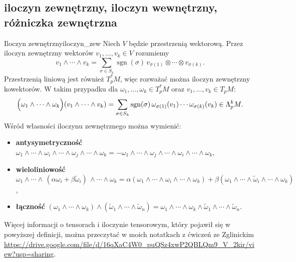 \documentclass{article}
\newcommand{\sgn}{\operatorname{sgn}}
\begin{document}
\subsection{iloczyn zewnętrzny, iloczyn wewnętrzny, różniczka zewnętrzna} \label{sec:iloczyny_różniczka}

\begin{dfn}{Iloczyn zewnętrzny}{iloczyn_zew}
  Niech $V$ będzie przestrzenią wektorową. Przez iloczyn zewnętrzny wektorów $v_1,\ldots,v_k\in V$ rozumiemy
  \[
  v_1\wedge\cdots\wedge v_k = \sum_{\sigma\in S_k} \sgn(\sigma)\, v_{\sigma(1)}\otimes\cdots\otimes v_{\sigma(k)}. 
  \]
  Przestrzenią liniową jest również $T^*_p M$, więc rozważać można iloczyn zewnętrzny kowektorów. W takim przypadku dla $\omega_1,\ldots,\omega_k\in T^*_p M$ oraz $v_1,\ldots,v_k\in T_p M$:
  \[
  \Bigl( \omega_1\wedge\cdots\wedge\omega_k \Bigr)(v_1\wedge\cdots\wedge v_k) = \sum_{\sigma\in S_k} \sgn(\sigma)\, \omega_{\sigma(1)}(v_1)\cdots \omega_{\sigma(k)}(v_k) \in \Lambda^k_p M.
  \]
  Wśród własności iloczynu zewnętrznego można wymienić:
  \begin{itemize}
    \item \textbf{antysymetryczność} $\omega_1\wedge\cdots\wedge\omega_i\wedge\cdots\wedge\omega_j\wedge\cdots\wedge\omega_k = -\omega_1\wedge\cdots\wedge\omega_j\wedge\cdots\wedge\omega_i\wedge\cdots\wedge\omega_k$,
    \item \textbf{wieloliniowość} $\omega_1\wedge\cdots\wedge\,(\alpha\omega_i+\beta\widetilde{\omega}_i)\,\wedge\cdots\wedge\omega_k = \alpha(\omega_1\wedge\cdots\wedge\omega_i\wedge\cdots\wedge\omega_k) + \beta(\omega_1\wedge\cdots\wedge\widetilde{\omega}_i\wedge\cdots\wedge\omega_k)$,
    \item \textbf{łączność} $(\omega_1\wedge\cdots\wedge\omega_k)\wedge(\widetilde{\omega}_1\wedge\cdots\wedge\widetilde{\omega}_n)=\omega_1\wedge\cdots\wedge\omega_k\wedge\widetilde{\omega}_1\wedge\cdots\wedge\widetilde{\omega}_n$.
  \end{itemize}
\end{dfn}
Więcej informacji o tensorach i iloczynie tensorowym, który pojawił się w powyższej definicji, można przeczytać w moich notatkach z ćwiczeń ze Zglinickim \url{https://drive.google.com/file/d/16qXaC4W0_puQSz4xwP2QBLQm9_V_2kir/view?usp=sharing}.
\end{document}
